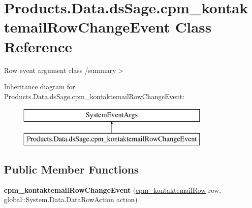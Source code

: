 \hypertarget{class_products_1_1_data_1_1ds_sage_1_1cpm__kontaktemail_row_change_event}{}\section{Products.\+Data.\+ds\+Sage.\+cpm\+\_\+kontaktemail\+Row\+Change\+Event Class Reference}
\label{class_products_1_1_data_1_1ds_sage_1_1cpm__kontaktemail_row_change_event}


Row event argument class /summary$>$  


Inheritance diagram for Products.\+Data.\+ds\+Sage.\+cpm\+\_\+kontaktemail\+Row\+Change\+Event\+:\begin{figure}[H]
\begin{center}
\leavevmode
\includegraphics[height=2.000000cm]{class_products_1_1_data_1_1ds_sage_1_1cpm__kontaktemail_row_change_event}
\end{center}
\end{figure}
\subsection*{Public Member Functions}
\begin{DoxyCompactItemize}
\item 
{\bfseries cpm\+\_\+kontaktemail\+Row\+Change\+Event} (\hyperlink{class_products_1_1_data_1_1ds_sage_1_1cpm__kontaktemail_row}{cpm\+\_\+kontaktemail\+Row} row, global\+::\+System.\+Data.\+Data\+Row\+Action action)\hypertarget{class_products_1_1_data_1_1ds_sage_1_1cpm__kontaktemail_row_change_event_a6992392a17e49d213d550bc813a16b16}{}\label{class_products_1_1_data_1_1ds_sage_1_1cpm__kontaktemail_row_change_event_a6992392a17e49d213d550bc813a16b16}

\end{DoxyCompactItemize}
